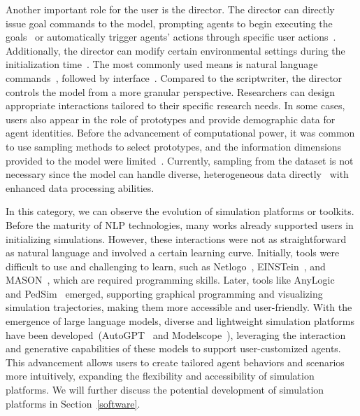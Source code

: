 Another important role for the user is the director.
The director can directly issue goal commands to the model, prompting agents to begin executing the goals~\cite{rana2023sayplangroundinglargelanguage, ahn2022icanisay} or automatically trigger agents' actions through specific user actions~\cite{10.1145/3613904.3642183, arakawa2024prismobserverinterventionagenthelp}.
Additionally, the director can modify certain environmental settings during the initialization time~\cite{park2023choicematessupportingunfamiliaronline, 10.1145/3613904.3642159}.
The most commonly used means is natural language commands~\cite{10.1145/3678585}, followed by interface~\cite{pan2024agentcoordvisuallyexploringcoordination}.
Compared to the scriptwriter, the director controls the model from a more granular perspective.
Researchers can design appropriate interactions tailored to their specific research needs.
In some cases, users also appear in the role of prototypes and provide demographic data for agent identities.
Before the advancement of computational power, it was common to use sampling methods to select prototypes, and the information dimensions provided to the model were limited~\cite{GAUBE201392}.
Currently, sampling from the dataset is not necessary since the model can handle diverse, heterogeneous data directly~\cite{gao2023s3socialnetworksimulationlarge} with enhanced data processing abilities.

In this category, we can observe the evolution of simulation platforms or toolkits.
Before the maturity of NLP technologies, many works already supported users in initializing simulations.
However, these interactions were not as straightforward as natural language and involved a certain learning curve.
Initially, tools were difficult to use and challenging to learn, such as Netlogo~\cite{netlogo}, EINSTein~\cite{berryman2008review}, and MASON~\cite{doi:10.1177/0037549705058073}, which are required programming skills.
Later, tools like AnyLogic~\cite{doi:https://doi.org/10.1002/9781118762745.ch12} and PedSim~\cite{Ped} emerged, supporting graphical programming and visualizing simulation trajectories, making them more accessible and user-friendly.
With the emergence of large language models, diverse and lightweight simulation platforms have been developed~(\eg AutoGPT~\cite{Significant_Gravitas_AutoGPT} and Modelscope~\cite{li2023modelscopeagentbuildingcustomizableagent}), leveraging the interaction and generative capabilities of these models to support user-customized agents.
This advancement allows users to create tailored agent behaviors and scenarios more intuitively, expanding the flexibility and accessibility of simulation platforms.
We will further discuss the potential development of simulation platforms in Section~\ref{software}. 


